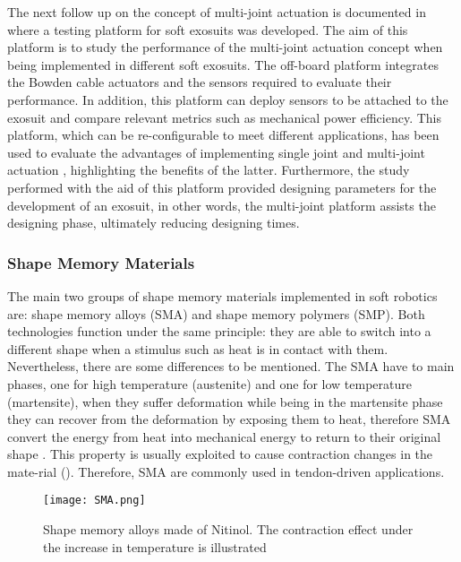 The next follow up on the concept of multi-joint actuation is documented in \cite{Ding2014} where a testing platform for soft exosuits was developed. The aim of this platform is to study the performance of the multi-joint actuation concept when being implemented in different soft exosuits. The off-board platform integrates the Bowden cable actuators and the sensors required to evaluate their performance. In addition, this platform can deploy sensors to be attached to the exosuit and compare relevant metrics such as mechanical power efficiency. This platform, which can be re-configurable to meet different applications, has been used to evaluate the advantages of implementing single joint and multi-joint actuation \cite{Ding2016}, highlighting the benefits of the latter. Furthermore, the study performed with the aid of this platform provided designing parameters for the development of an exosuit, in other words, the multi-joint platform assists the designing phase, ultimately reducing designing times.

\subsubsection{Shape Memory Materials}

The main two groups of shape memory materials implemented in soft robotics are: shape memory alloys (SMA) and shape memory polymers (SMP). Both technologies function under the same principle: they are able to switch into a different shape when a stimulus such as heat is in contact with them. Nevertheless, there are some differences to be mentioned. The SMA have to main phases, one for high temperature (austenite) and one for low temperature (martensite), when they suffer deformation while being in the martensite phase they can recover from the deformation by exposing them to heat, therefore SMA convert the energy from heat into mechanical energy to return to their original shape \cite{ImagesScientificInstrument2016}. This property is usually exploited to cause contraction changes in the mate-rial (). Therefore, SMA are commonly used in tendon-driven applications.
\begin{figure}[hbtp!]
    \centering
    \texttt{[image: SMA.png]}
    \caption{Shape memory alloys made of Nitinol. The contraction effect under the increase in temperature is illustrated \cite{ImagesScientificInstrument2016} }
    \label{fig:SMA}
\end{figure}

